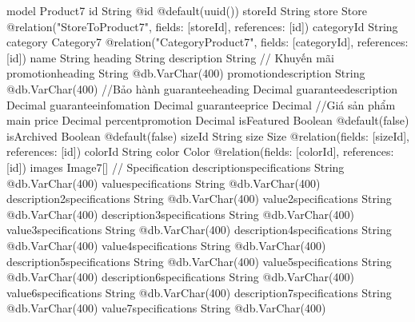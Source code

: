 model Product7 {
  id                           String                         @id @default(uuid())
  storeId                      String
  store                        Store                          @relation("StoreToProduct7", fields: [storeId], references: [id])
  categoryId                   String
  category                     Category7                      @relation("CategoryProduct7", fields: [categoryId], references: [id])
  name                         String
  heading                      String
  description                  String
  // Khuyến mãi
  promotionheading             String                         @db.VarChar(400)
  promotiondescription         String                         @db.VarChar(400)
  //Bảo hành
  guaranteeheading             Decimal
  guaranteedescription         Decimal
  guaranteeinfomation          Decimal
  guaranteeprice               Decimal
  //Giá sản phẩm main
  price                        Decimal
  percentpromotion             Decimal
  isFeatured                   Boolean                        @default(false)
  isArchived                   Boolean                        @default(false)
  sizeId                       String
  size                         Size                           @relation(fields: [sizeId], references: [id])
  colorId                      String
  color                        Color                          @relation(fields: [colorId], references: [id])
  images                       Image7[]
  // Specification
  descriptionspecifications    String                         @db.VarChar(400)
  valuespecifications          String                         @db.VarChar(400)
  description2specifications   String                         @db.VarChar(400)
  value2specifications         String                         @db.VarChar(400)
  description3specifications   String                         @db.VarChar(400)
  value3specifications         String                         @db.VarChar(400)
  description4specifications   String                         @db.VarChar(400)
  value4specifications         String                         @db.VarChar(400)
  description5specifications   String                         @db.VarChar(400)
  value5specifications         String                         @db.VarChar(400)
  description6specifications   String                         @db.VarChar(400)
  value6specifications         String                         @db.VarChar(400)
  description7specifications   String                         @db.VarChar(400)
  value7specifications         String                         @db.VarChar(400)
}
